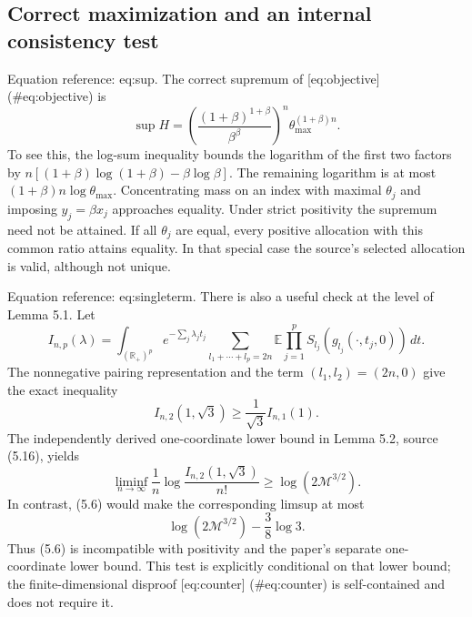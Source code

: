 \documentclass[10pt]{article}
\begin{document}
\subsection*{Correct maximization and an internal consistency test}
Equation reference: eq:sup. The correct supremum of [eq:objective] (\#eq:objective) is \[
 \sup H=
 \left(\frac{(1+\beta)^{1+\beta}}{\beta^\beta}\right)^n
 \theta_{\max}^{(1+\beta)n}.\] To see this, the log-sum inequality bounds the logarithm of the first two factors by \(n[(1+\beta)\log(1+\beta)-\beta\log\beta]\). The remaining logarithm is at most \((1+\beta)n\log\theta_{\max}\). Concentrating mass on an index with maximal \(\theta_j\) and imposing \(y_j=\beta x_j\) approaches equality. Under strict positivity the supremum need not be attained. If all \(\theta_j\) are equal, every positive allocation with this common ratio attains equality. In that special case the source’s selected allocation is valid, although not unique.\par
Equation reference: eq:singleterm. There is also a useful check at the level of Lemma 5.1. Let \[I_{n,p}(\lambda)=
 \int_{(\mathbb R_+)^p}e^{-\sum_j\lambda_jt_j}
 \sum_{l_1+\cdots+l_p=2n}
     \mathbb E\prod_{j=1}^p S_{l_j}(g_{l_j}(\cdot,t_j,0))\,dt .\] The nonnegative pairing representation and the term \((l_1,l_2)=(2n,0)\) give the exact inequality \[
 I_{n,2}(1,\sqrt3)\ge\frac1{\sqrt3}I_{n,1}(1).\] The independently derived one-coordinate lower bound in Lemma 5.2, source (5.16), yields \[\liminf_{n\to\infty}\frac1n
       \log\frac{I_{n,2}(1,\sqrt3)}{n!}
 \ge \log(2\mathcal M^{3/2}).\] In contrast, (5.6) would make the corresponding limsup at most \[\log(2\mathcal M^{3/2})-\frac38\log3.\] Thus (5.6) is incompatible with positivity and the paper’s separate one-coordinate lower bound. This test is explicitly conditional on that lower bound; the finite-dimensional disproof [eq:counter] (\#eq:counter) is self-contained and does not require it.\par
\end{document}
